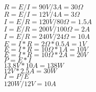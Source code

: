 \documentclass{article}
\begin{document}
\thispagestyle{empty}

$ R = E / I = 90 V / 3 A = 30 \Omega $ \\
$ R = E / I = 12 V / 4 A = 3 \Omega $ \\
$ I = E / R = 120 V / 80 \Omega = 1.5 A $ \\
$ I = E / R = 200 V / 100 \Omega = 2 A $ \\
$ I = E / R = 240 V / 24 \Omega = 10 A $ \\
$ E = I * R = 2 \Omega * 0.5 A = 1 V $ \\
$ E = I * R = 10 \Omega * 1 A = 10 V $ \\
$ E = I * R = 10 \Omega * 2 A = 20 V $ \\

$ P = E * I $ \\
$ 13.8 V * 10 A = 138 W $ \\
$ 12 V * 2.5 A = 30 W $ \\
$ I = P / E $ \\
$ 120 W / 12 V = 10 A $ \\
\end{document}
